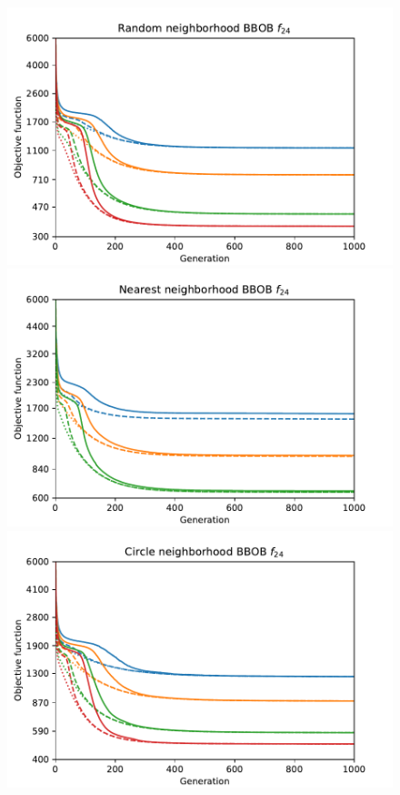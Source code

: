 \begin{figure}[ht!]
    \begin{minipage}[t]{0.32\textwidth}
        \centering
        \includegraphics[width=\textwidth]{img/runs/fitness_pso_f24_neighRandom.pdf}
    \end{minipage}
    \hfill
    \begin{minipage}[t]{0.32\textwidth}
        \centering
        \includegraphics[width=\textwidth]{img/runs/fitness_pso_f24_neighNearest.pdf}
    \end{minipage}
    \hfill
    \begin{minipage}[t]{0.32\textwidth}
        \centering
        \includegraphics[width=\textwidth]{img/runs/fitness_pso_f24_neighCircle.pdf}
    \end{minipage}


\end{figure}
